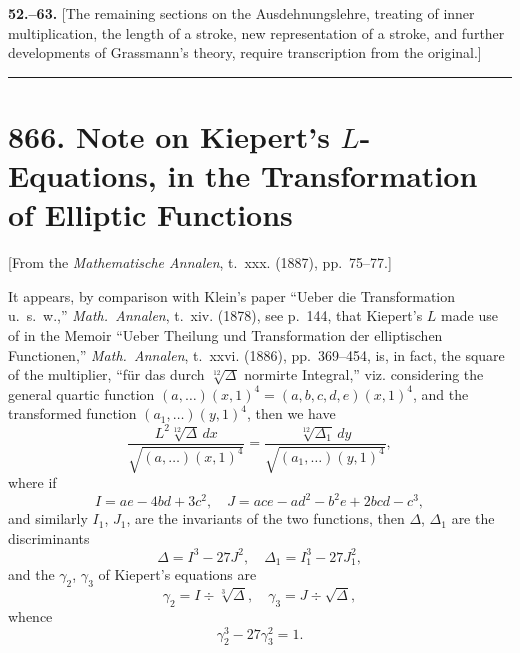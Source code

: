 \documentclass[11pt,a4paper]{book}
\begin{document}
\textbf{52.--63.} [The remaining sections on the Ausdehnungslehre, treating of inner multiplication, the length of a stroke, new representation of a stroke, and further developments of Grassmann's theory, require transcription from the original.]

\vspace{12pt}
\hrule
\vspace{12pt}

\section*{866. Note on Kiepert's $L$-Equations, in the Transformation of Elliptic Functions}

\begin{center}
[From the \textit{Mathematische Annalen}, t.~xxx. (1887), pp.~75--77.]
\end{center}

It appears, by comparison with Klein's paper ``Ueber die Transformation u.~s.~w.,'' \textit{Math.~Annalen}, t.~xiv. (1878), see p.~144, that Kiepert's $L$ made use of in the Memoir ``Ueber Theilung und Transformation der elliptischen Functionen,'' \textit{Math.~Annalen}, t.~xxvi. (1886), pp.~369--454, is, in fact, the square of the multiplier, ``f\"ur das durch $\sqrt[12]{\Delta}$ normirte Integral,'' viz. considering the general quartic function $(a, \ldots)(x, 1)^4 = (a, b, c, d, e)(x, 1)^4$, and the transformed function $(a_1, \ldots)(y, 1)^4$, then we have
\[
\frac{L^2 \sqrt[12]{\Delta}\, dx}{\sqrt{(a, \ldots)(x, 1)^4}} = \frac{\sqrt[12]{\Delta_1}\, dy}{\sqrt{(a_1, \ldots)(y, 1)^4}},
\]
where if
\[I = ae - 4bd + 3c^2, \quad J = ace - ad^2 - b^2e + 2bcd - c^3,\]
and similarly $I_1$, $J_1$, are the invariants of the two functions, then $\Delta$, $\Delta_1$ are the discriminants
\[\Delta = I^3 - 27J^2, \quad \Delta_1 = I_1^3 - 27J_1^2,\]
and the $\gamma_2$, $\gamma_3$ of Kiepert's equations are
\[\gamma_2 = I \div \sqrt[3]{\Delta}, \quad \gamma_3 = J \div \sqrt{\Delta},\]
whence
\[\gamma_2^3 - 27\gamma_3^2 = 1.\]
\end{document}

